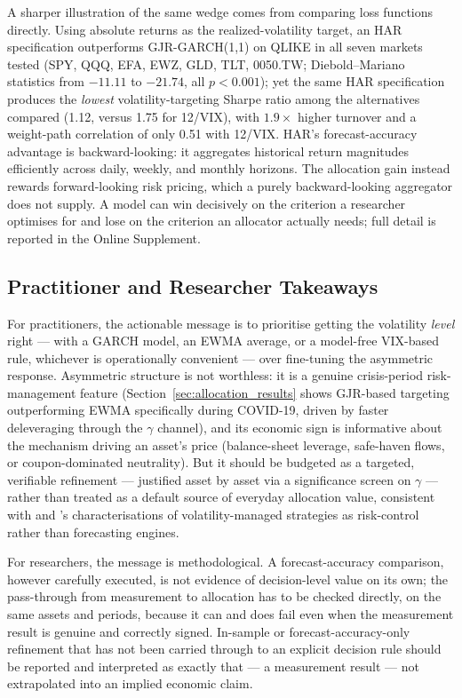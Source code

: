 A sharper illustration of the same wedge comes from comparing loss functions directly. Using absolute returns as the realized-volatility target, an HAR specification outperforms GJR-GARCH(1,1) on QLIKE in all seven markets tested (SPY, QQQ, EFA, EWZ, GLD, TLT, 0050.TW; Diebold--Mariano statistics from $-11.11$ to $-21.74$, all $p<0.001$); yet the same HAR specification produces the \emph{lowest} volatility-targeting Sharpe ratio among the alternatives compared (1.12, versus 1.75 for 12/VIX), with $1.9\times$ higher turnover and a weight-path correlation of only 0.51 with 12/VIX. HAR's forecast-accuracy advantage is backward-looking: it aggregates historical return magnitudes efficiently across daily, weekly, and monthly horizons. The allocation gain instead rewards forward-looking risk pricing, which a purely backward-looking aggregator does not supply. A model can win decisively on the criterion a researcher optimises for and lose on the criterion an allocator actually needs; full detail is reported in the Online Supplement.

\subsection{Practitioner and Researcher Takeaways}
\label{sec:takeaways}

For practitioners, the actionable message is to prioritise getting the volatility \emph{level} right --- with a GARCH model, an EWMA average, or a model-free VIX-based rule, whichever is operationally convenient --- over fine-tuning the asymmetric response. Asymmetric structure is not worthless: it is a genuine crisis-period risk-management feature (Section~\ref{sec:allocation_results} shows GJR-based targeting outperforming EWMA specifically during COVID-19, driven by faster deleveraging through the $\gamma$ channel), and its economic sign is informative about the mechanism driving an asset's price (balance-sheet leverage, safe-haven flows, or coupon-dominated neutrality). But it should be budgeted as a targeted, verifiable refinement --- justified asset by asset via a significance screen on $\gamma$ --- rather than treated as a default source of everyday allocation value, consistent with \citet{hood2025} and \citet{nelson2025}'s characterisations of volatility-managed strategies as risk-control rather than forecasting engines.

For researchers, the message is methodological. A forecast-accuracy comparison, however carefully executed, is not evidence of decision-level value on its own; the pass-through from measurement to allocation has to be checked directly, on the same assets and periods, because it can and does fail even when the measurement result is genuine and correctly signed. In-sample or forecast-accuracy-only refinement that has not been carried through to an explicit decision rule should be reported and interpreted as exactly that --- a measurement result --- not extrapolated into an implied economic claim.

